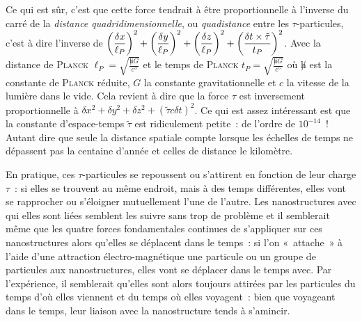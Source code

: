 {Ce qui est sûr, c’est que cette force tendrait à être proportionnelle à l’inverse du carré de la \emph{distance quadridimensionnelle}, ou \emph{quadistance} entre les $\tau$-particules, c’est à dire l’inverse de $\displaystyle\def\aux#1#2{\left(\frac{\delta #1}{#2_P}\right)^2}\aux{x}\ell + \aux{y}\ell + \aux{z}\ell + \aux{t \times \tilde\tau}{t}$.
Avec la distance de \textsc{Planck} $\displaystyle\ell_P = \sqrt{\frac{\not h G}{c^3}}$ et le temps de \textsc{Planck} $\displaystyle t_P = \sqrt{\frac{\not h G}{c^5}}$ où $\not h$ est la constante de \textsc{Planck} réduite, $G$ la constante gravitationnelle et $c$ la vitesse de la lumière dans le vide.
Cela revient à dire que la force $\tau$ est inversement proportionnelle à $\displaystyle\delta{x}^2 + \delta{y}^2 + \delta{z}^2 + \left(\tilde\tau c\delta{t}\right)^2$.
Ce qui est assez intéressant est que la constante d’espace-temps $\tilde\tau$ est ridiculement petite~:  de l’ordre de $10^{-14}$~!
Autant dire que seule la distance spatiale compte lorsque les échelles de temps ne dépassent pas la centaine d’année et celles de distance le kilomètre.

En pratique, ces $\tau$-particules se repoussent ou s’attirent en fonction de leur charge $\tau$~:  si elles se trouvent au même endroit, mais à des temps différentes, elles vont se rapprocher ou s’éloigner mutuellement l’une de l’autre.
Les nanostructures avec qui elles sont liées semblent les suivre sans trop de problème et il semblerait même que les quatre forces fondamentales continues de s’appliquer sur ces nanostructures alors qu’elles se déplacent dans le temps~:  si l’on «~attache~» à l’aide d’une attraction électro-magnétique une particule ou un groupe de particules aux nanostructures, elles vont se déplacer dans le temps avec.  Par l’expérience, il semblerait qu’elles sont alors toujours attirées par les particules du temps d’où elles viennent et du temps où elles voyagent~:  bien que voyageant dans le temps, leur liaison avec la nanostructure tends à s’amincir.

}
